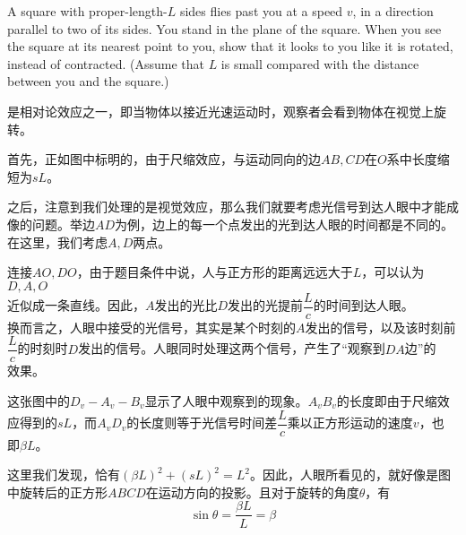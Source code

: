 \begin{solution}
	
	A square with proper-length-$L$ sides flies past you at a speed $v$, in a direction parallel to two of its sides. You stand in the plane of the square. When you see the square at its nearest point to you, show that it looks to you like it is rotated, instead of contracted. (Assume that $L$ is small compared with the distance between you and the square.)
	
	\tcbrule
	
     是相对论效应之一，即当物体以接近光速运动时，观察者会看到物体在视觉上旋转。
    
    
    首先，正如图中标明的，由于尺缩效应，与运动同向的边$AB,CD$在$O$系中长度缩短为$sL$。
    
    之后，注意到我们处理的是视觉效应，那么我们就要考虑光信号到达人眼中才能成像的问题。举边$AD$为例，边上的每一个点发出的光到达人眼的时间都是不同的。在这里，我们考虑$A,D$两点。
    
    连接$AO,DO$，由于题目条件中说，人与正方形的距离远远大于$L$，可以认为$D,A,O$\\[1ex]
    近似成一条直线。因此，$A$发出的光比$D$发出的光提前$\dfrac{L}{c}$的时间到达人眼。\\[1ex]
    换而言之，人眼中接受的光信号，其实是某个时刻的$A$发出的信号，以及该时刻前\\[1ex]
    $\dfrac{L}{c}$的时刻时$D$发出的信号。人眼同时处理这两个信号，产生了“观察到$DA$边”的\\[1ex]
    效果。
    
    
    这张图中的$D_v-A_v-B_v$显示了人眼中观察到的现象。$A_vB_v$的长度即由于尺缩效\\[1ex]
    应得到的$sL$，而$A_vD_v$的长度则等于光信号时间差$\dfrac{L}{c}$乘以正方形运动的速度$v$，也\\[1ex]
    即$\beta L$。
    
    这里我们发现，恰有$(\beta L)^2 + (sL)^2 = L^2$。因此，人眼所看见的，就好像是图中旋转后的正方形$ABCD$在运动方向的投影。且对于旋转的角度$\theta$，有
    \[\sin\theta=\dfrac{\beta L}{L}=\beta\]
\end{solution}
